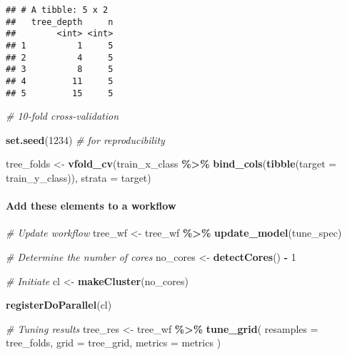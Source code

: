 \documentclass[
]{book}
\newenvironment{Shaded}{\begin{snugshade}}{\end{snugshade}}
\newcommand{\CommentTok}[1]{\textcolor[rgb]{0.56,0.35,0.01}{\textit{#1}}}
\newcommand{\DataTypeTok}[1]{\textcolor[rgb]{0.13,0.29,0.53}{#1}}
\newcommand{\DecValTok}[1]{\textcolor[rgb]{0.00,0.00,0.81}{#1}}
\newcommand{\KeywordTok}[1]{\textcolor[rgb]{0.13,0.29,0.53}{\textbf{#1}}}
\newcommand{\NormalTok}[1]{#1}
\newcommand{\OperatorTok}[1]{\textcolor[rgb]{0.81,0.36,0.00}{\textbf{#1}}}
\newcommand{\StringTok}[1]{\textcolor[rgb]{0.31,0.60,0.02}{#1}}
\begin{document}
\begin{verbatim}
## # A tibble: 5 x 2
##   tree_depth     n
##        <int> <int>
## 1          1     5
## 2          4     5
## 3          8     5
## 4         11     5
## 5         15     5
\end{verbatim}

\begin{Shaded}
\begin{Highlighting}[]
\CommentTok{\# 10{-}fold cross{-}validation}

\KeywordTok{set.seed}\NormalTok{(}\DecValTok{1234}\NormalTok{) }\CommentTok{\# for reproducibility }

\NormalTok{tree\_folds \textless{}{-}}\StringTok{ }\KeywordTok{vfold\_cv}\NormalTok{(train\_x\_class }\OperatorTok{\%\textgreater{}\%}\StringTok{ }\KeywordTok{bind\_cols}\NormalTok{(}\KeywordTok{tibble}\NormalTok{(}\DataTypeTok{target =}\NormalTok{ train\_y\_class)),}
                       \DataTypeTok{strata =}\NormalTok{ target)}
\end{Highlighting}
\end{Shaded}

\hypertarget{add-these-elements-to-a-workflow-1}{%
\paragraph{Add these elements to a workflow}\label{add-these-elements-to-a-workflow-1}}

\begin{Shaded}
\begin{Highlighting}[]
\CommentTok{\# Update workflow }
\NormalTok{tree\_wf \textless{}{-}}\StringTok{ }\NormalTok{tree\_wf }\OperatorTok{\%\textgreater{}\%}\StringTok{ }\KeywordTok{update\_model}\NormalTok{(tune\_spec)}

\CommentTok{\# Determine the number of cores}
\NormalTok{no\_cores \textless{}{-}}\StringTok{ }\KeywordTok{detectCores}\NormalTok{() }\OperatorTok{{-}}\StringTok{ }\DecValTok{1}

\CommentTok{\# Initiate}
\NormalTok{cl \textless{}{-}}\StringTok{ }\KeywordTok{makeCluster}\NormalTok{(no\_cores)}

\KeywordTok{registerDoParallel}\NormalTok{(cl)}

\CommentTok{\# Tuning results }
\NormalTok{tree\_res \textless{}{-}}\StringTok{ }\NormalTok{tree\_wf }\OperatorTok{\%\textgreater{}\%}
\StringTok{  }\KeywordTok{tune\_grid}\NormalTok{(}
    \DataTypeTok{resamples =}\NormalTok{ tree\_folds, }
    \DataTypeTok{grid =}\NormalTok{ tree\_grid,}
    \DataTypeTok{metrics =}\NormalTok{ metrics}
\NormalTok{  )}
\end{Highlighting}
\end{Shaded}
\end{document}
